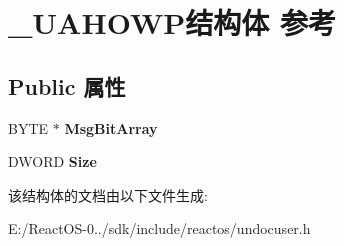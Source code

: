 \hypertarget{struct___u_a_h_o_w_p}{}\section{\+\_\+\+U\+A\+H\+O\+W\+P结构体 参考}
\label{struct___u_a_h_o_w_p}
\subsection*{Public 属性}
\begin{DoxyCompactItemize}
\item 
\mbox{\label{struct___u_a_h_o_w_p_a83084bb9cfa06028fc318e3b66fa1078}} 
B\+Y\+TE $\ast$ {\bfseries Msg\+Bit\+Array}
\item 
\mbox{\label{struct___u_a_h_o_w_p_aafd6b39a57a7ae30b8479c903c733f98}} 
D\+W\+O\+RD {\bfseries Size}
\end{DoxyCompactItemize}


该结构体的文档由以下文件生成\+:\begin{DoxyCompactItemize}
\item 
E\+:/\+React\+O\+S-\/0../sdk/include/reactos/undocuser.\+h\end{DoxyCompactItemize}

